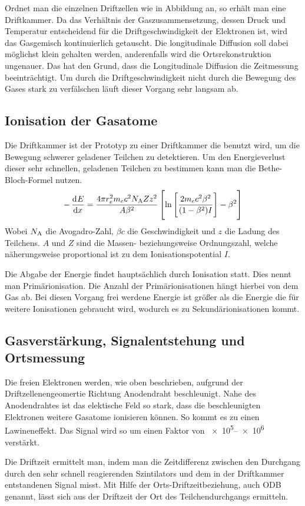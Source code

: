 \documentclass[11pt, ngerman, fleqn, DIV=15, headinclude, BCOR=2cm]{scrreprt}
\begin{document}
Ordnet man die einzelnen Driftzellen wie in Abbildung \fehlt an, so erhält man eine Driftkammer.
Da das Verhältnis der Gaszusammensetzung, dessen Druck und Temperatur
entscheidend für die Driftgeschwindigkeit der Elektronen ist, wird das Gasgemisch kontinuierlich getauscht. 
Die longitudinale Diffusion soll dabei möglichst klein gehalten werden,
anderenfalls wird die Ortsrekonstruktion ungenauer.
Das hat den Grund, dass die Longitudinale Diffusion die Zeitmessung beeinträchtigt.
Um durch die Driftgeschwindigkeit nicht durch die Bewegung des Gases stark zu verfälschen läuft dieser Vorgang sehr langsam ab.

\subsection{Ionisation der Gasatome}
Die Driftkammer ist der Prototyp zu einer Driftkammer die benutzt wird, um
die Bewegung schwerer geladener Teilchen zu detektieren.
Um den Energieverlust dieser sehr schnellen, geladenen Teilchen zu bestimmen kann man die Bethe-Bloch-Formel nutzen.
\[
    -\dod Ex = \frac{4 \pi r^2_e m_e c^2 N_\text{A} Z z^2}{A \beta^2}\sbr{\ln\sbr{\frac{2m_e c^2 \beta^2}{(1-\beta^2)I}}-\beta^2}
\]
Wobei $N_\text A$ die Avogadro-Zahl, $\beta c$ die Geschwindigkeit und $z$ die Ladung des Teilchens. $A$ und $Z$ sind die Massen- beziehungsweise Ordnungszahl, welche näherungsweise proportional ist zu dem Ionisationspotential $I$.

Die Abgabe der Energie findet hauptsächlich durch Ionisation statt.
Dies nennt man Primärionisation.
Die Anzahl der Primärionisationen hängt hierbei von dem Gas ab.
Bei diesen Vorgang frei werdene Energie ist größer als die Energie die für weitere Ionisationen gebraucht wird, wodurch es zu Sekundärionisationen kommt.

\subsection{Gasverstärkung, Signalentstehung und Ortsmessung}
Die freien Elektronen werden, wie oben beschrieben, aufgrund der Driftzellenengeomertie Richtung Anodendraht beschleunigt. 
Nahe des Anodendrahtes ist das elektische Feld so stark, dass die beschleunigten Elektronen weitere Gasatome ionisieren können.
So kommt es zu einen Lawineneffekt.
Das Signal wird so um einen Faktor von \numrange{e5}{e6} verstärkt.

Die Driftzeit ermittelt man, indem man die Zeitdifferenz zwischen den Durchgang durch den sehr schnell reagierenden Szintilators und dem in der Driftkammer entstandenen Signal misst.
Mit Hilfe der Orts-Driftzeitbeziehung, auch ODB genannt, lässt sich aus der Driftzeit der Ort des Teilchendurchgangs ermitteln.
\end{document}
